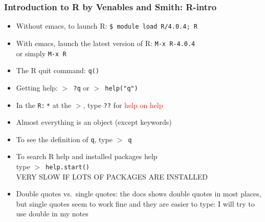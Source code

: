 \documentclass[11pt,pdftex,dvipsnames,usenames,helvetica]{beamer}
\begin{document}
\begin{frame} 
\frametitle{Introduction to R by Venables and Smith: R-intro}

\begin{itemize}
\item Without emacs, to launch R: {\tt \$ module load R/4.0.4; R}  
\item With emacs, launch the latest version of R: {\tt M-x R-4.0.4}\\
or simply {\tt M-x R}
\item The R quit command: {\tt q()}
\item Getting help: {\tt $>$ ?q} or {\tt $>$ help("q")}
\item In the {\tt *R:$~$*} at the {\tt $>$}, type {\tt ??} for 
\textcolor{red}{help on help}
\item Almost everything is an object (except keywords)
\item To see the definition of {\tt q}, type {\tt $>$ q}
\item To search R help and installed packages help\\
 type {\tt $>$ help.start()}\\
 VERY SLOW IF LOTS OF PACKAGES ARE INSTALLED
\item Double quotes vs.\ single quotes: the docs
shows double quotes in most places, but single quotes seem to work fine
and they are easier to type: I will try to use double in my notes
\end{itemize} 

\end{frame}
\end{document}
